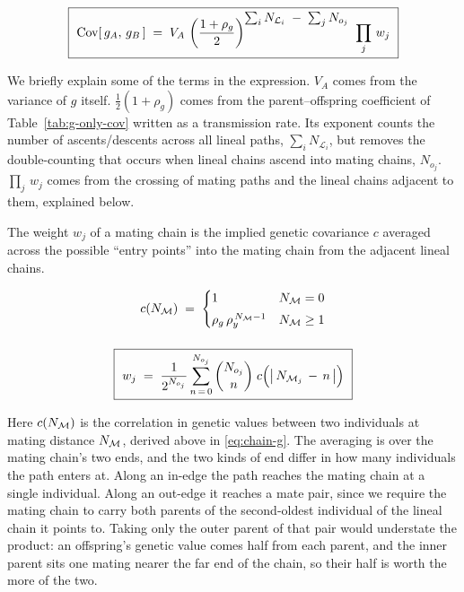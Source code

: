 \documentclass[12pt]{article}
\renewcommand{\Mu}{\mathcal{M}}
\renewcommand{\Lin}{\mathcal{L}}
\begin{document}
\begin{equation}\label{eq:path-product}
    \boxed{\ \Cov[\,g_A,\, g_B\,] \;=\; V_A\,
    \left( \frac{1+\rho_g}{2} \right)^{\textstyle \sum_i N_{\Lin_i} \;-\; \sum_j N_{o_j}}
    \ \prod_j\, w_j \ }
\end{equation}

We briefly explain some of the terms in the expression.
$V_A$ comes from the variance of $g$ itself.
$\tfrac12(1+\rho_g)$ comes from the parent--offspring coefficient of Table~\ref{tab:g-only-cov} written as a transmission rate.
Its exponent counts the number of ascents/descents across all lineal paths, $\sum_i N_{\Lin_i} $, but removes the double-counting that occurs when lineal chains ascend into mating chains, $N_{o_j}$.
$\prod_j\, w_j$ comes from the crossing of mating paths and the lineal chains adjacent to them, explained below.

The weight $w_j$ of a mating chain is the implied genetic covariance $c$ averaged across the possible ``entry points'' into the mating chain from the adjacent lineal chains.

\begin{equation}\label{eq:chain-weight}
\begin{gathered}
    c(\Nmu) \;=\;
    \begin{cases}
        1 & \Nmu = 0 \\[3pt]
        \rho_g\, \rho_y^{\,\Nmu-1} & \Nmu \geq 1
    \end{cases}
    \\[12pt]
    \boxed{\ w_j \;=\; \frac{1}{2^{N_{o_j}}}
    \sum_{n \,=\, 0}^{N_{o_j}}
    \binom{N_{o_j}}{n}\;
    c\Big( \big|\, N_{\Mu_j} \,-\, n \,\big| \Big) \ }
\end{gathered}
\end{equation}


Here $c(N_{\mathcal{M}})$ is the correlation in genetic values between two individuals at mating distance $N_{\mathcal{M}}$, derived above in \eqref{eq:chain-g}.
The averaging is over the mating chain's two ends, and the two kinds of end differ in how many individuals the path enters at.
Along an in-edge the path reaches the mating chain at a single individual.
Along an out-edge it reaches a mate pair, since we require the mating chain to carry both parents of the second-oldest individual of the lineal chain it points to.
Taking only the outer parent of that pair would understate the product: an offspring's genetic value comes half from each parent, and the inner parent sits one mating nearer the far end of the chain, so their half is worth the more of the two.
\end{document}
